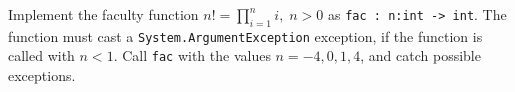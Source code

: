 \label{fac1} Implement the faculty function $n! = \prod_{i=1}^ni,\; n >0$ as \lstinline{fac : n:int -> int}. The function must cast a \lstinline{System.ArgumentException} exception, if the function is called with $n < 1$. Call \lstinline{fac} with the values $n=-4,0,1,4$, and catch possible exceptions.